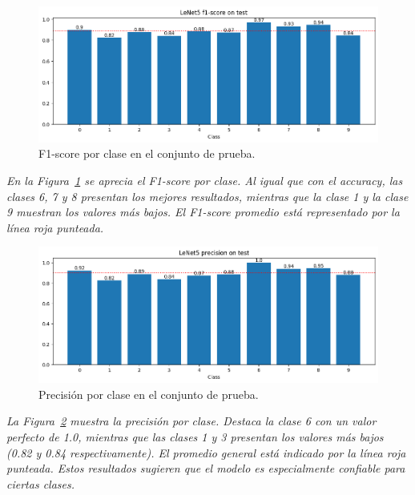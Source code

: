 \documentclass[conference]{IEEEtran}
\begin{document}
\begin{figure}[H]
    \centering
    \includegraphics[width=0.95\linewidth]{graphics-raw-da/raw-da-f1score-test.png}
    \caption{F1-score por clase en el conjunto de prueba.}
    \label{fig:raw-da-f1score-test}
\end{figure}
\noindent\textit{
En la Figura~\ref{fig:raw-da-f1score-test} se aprecia el F1-score por clase. Al igual que con el accuracy, las clases 6, 7 y 8 presentan los mejores resultados, mientras que la clase 1 y la clase 9 muestran los valores más bajos. El F1-score promedio está representado por la línea roja punteada.
}

\begin{figure}[H]
    \centering
    \includegraphics[width=0.95\linewidth]{graphics-raw-da/raw-da-precision-test.png}
    \caption{Precisión por clase en el conjunto de prueba.}
    \label{fig:raw-da-precision-test}
\end{figure}
\noindent\textit{
La Figura~\ref{fig:raw-da-precision-test} muestra la precisión por clase. Destaca la clase 6 con un valor perfecto de 1.0, mientras que las clases 1 y 3 presentan los valores más bajos (0.82 y 0.84 respectivamente). El promedio general está indicado por la línea roja punteada. Estos resultados sugieren que el modelo es especialmente confiable para ciertas clases.
}
\end{document}
